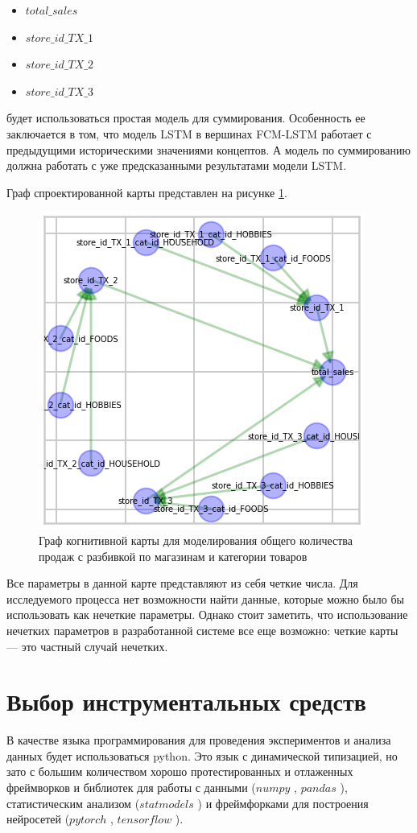 \begin{itemize}
	\item $ total\_sales $
	\item $ store\_id\_TX\_1 $
	\item $ store\_id\_TX\_2 $
	\item $ store\_id\_TX\_3 $
\end{itemize}

\noindent будет использоваться простая модель для суммирования.
Особенность ее заключается в том, что модель LSTM в вершинах FCM-LSTM работает
с предыдущими историческими значениями концептов. А модель по суммированию должна работать
с уже предсказанными результатами модели LSTM.

Граф спроектированной карты представлен на рисунке \ref{img:fcm_lstm_map}.

\def\figurename{Рис}
\begin{figure}[t]
	\centering
	\includegraphics[width=0.5\columnwidth]{./img/fcm_lstm_map.png}
	\caption{Граф когнитивной карты для моделирования общего количества продаж с разбивкой по магазинам и категории товаров}
	\label{img:fcm_lstm_map}
\end{figure}

Все параметры в данной карте представляют из себя четкие числа.
Для исследуемого процесса нет возможности найти данные, которые
можно было бы использовать как нечеткие параметры.
Однако стоит заметить, что использование нечетких параметров
в разработанной системе все еще возможно:
четкие карты --- это частный случай нечетких.

\section{Выбор инструментальных средств}

В качестве языка программирования для проведения экспериментов и анализа данных
будет использоваться python. Это язык с динамической типизацией, но зато с
большим количеством хорошо протестированных и отлаженных фреймворков и библиотек для работы
с данными ($numpy$ \cite{oliphant2006guide}, $pandas$ \cite{reback2020pandas}), статистическим анализом ($statmodels$ \cite{seabold2010statsmodels})
и фреймфорками для построения нейросетей ($pytorch$ \cite{NEURIPS2019_9015}, $tensorflow$ \cite{tensorflow2015-whitepaper} ).

